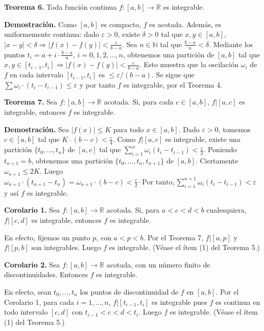\documentclass[12pt,oneside]{book}
\begin{document}
\textbf{Teorema 6.} Toda función continua \(f: [a, b] \to \mathbb{R}\) es integrable.

\textbf{Demostración.} Como \([a, b]\) es compacto, \(f\) es acotada. Además, es uniformemente continua: dado \(\varepsilon > 0\), existe \(\delta > 0\) tal que \(x, y \in [a, b]\), \(|x - y| < \delta \Rightarrow |f(x) - f(y)| < \frac{\varepsilon}{b - a}\). Sea \(n \in \mathbb{N}\) tal que \(\frac{b - a}{n} < \delta\). Mediante los puntos \(t_i = a + i \cdot \frac{b - a}{n}\), \(i = 0, 1, 2, \ldots, n\), obtenemos una partición de \([a, b]\) tal que \(x, y \in [t_{i-1}, t_i] \Rightarrow |f(x) - f(y)| < \frac{\varepsilon}{b - a}\). Esto muestra que la oscilación \(\omega_i\) de \(f\) en cada intervalo \([t_{i-1}, t_i]\) es \(\leq \varepsilon / (b - a)\). Se sigue que \(\sum \omega_i \cdot (t_i - t_{i-1}) \leq \varepsilon\) y por tanto \(f\) es integrable, por el Teorema 4.

\textbf{Teorema 7.} Sea \(f: [a, b] \to \mathbb{R}\) acotada. Si, para cada \(c \in [a, b]\), \(f|[a, c]\) es integrable, entonces \(f\) es integrable.

\textbf{Demostración.} Sea \(|f(x)| \leq K\) para todo \(x \in [a, b]\). Dado \(\varepsilon > 0\), tomemos \(c \in [a, b]\) tal que \(K \cdot (b - c) < \frac{\varepsilon}{4}\). Como \(f|[a, c]\) es integrable, existe una partición \(\{t_0, \ldots, t_n\}\) de \([a, c]\) tal que \(\sum_{i=1}^n \omega_i(t_i - t_{i-1}) < \frac{\varepsilon}{2}\). Poniendo \(t_{n+1} = b\), obtenemos una partición \(\{t_0, \ldots, t_n, t_{n+1}\}\) de \([a, b]\). Ciertamente \(\omega_{n+1} \leq 2K\). Luego \( \omega_{n+1} \cdot (t_{n+1} - t_n) = \omega_{n+1} \cdot (b - c) < \frac{\varepsilon}{2} \cdot \text{Por tanto}, \sum_{i=1}^{n+1} \omega_i(t_i - t_{i-1}) < \varepsilon \) y así \( f \) es integrable.

\textbf{Corolario 1.} Sea \( f: [a, b] \to \mathbb{R} \) acotada. Si, para \( a < c < d < b \) cualesquiera, \( f|[c, d] \) es integrable, entonces \( f \) es integrable.

En efecto, fijemos un punto \( p \), con \( a < p < b \). Por el Teorema 7, \( f|[a, p] \) y \( f|[p, b] \) son integrables. Luego \( f \) es integrable. (Véase el ítem (1) del Teorema 5.)

\textbf{Corolario 2.} Sea \( f: [a, b] \to \mathbb{R} \) acotada, con un número finito de discontinuidades. Entonces \( f \) es integrable.

En efecto, sean \( t_0, \ldots, t_n \) los puntos de discontinuidad de \( f \) en \([a, b]\). Por el Corolario 1, para cada \( i = 1, \ldots, n \), \( f|[t_{i-1}, t_i] \) es integrable pues \( f \) es continua en todo intervalo \([c, d]\) con \( t_{i-1} < c < d < t_i \). Luego \( f \) es integrable. (Véase el ítem (1) del Teorema 5.)
\end{document}
